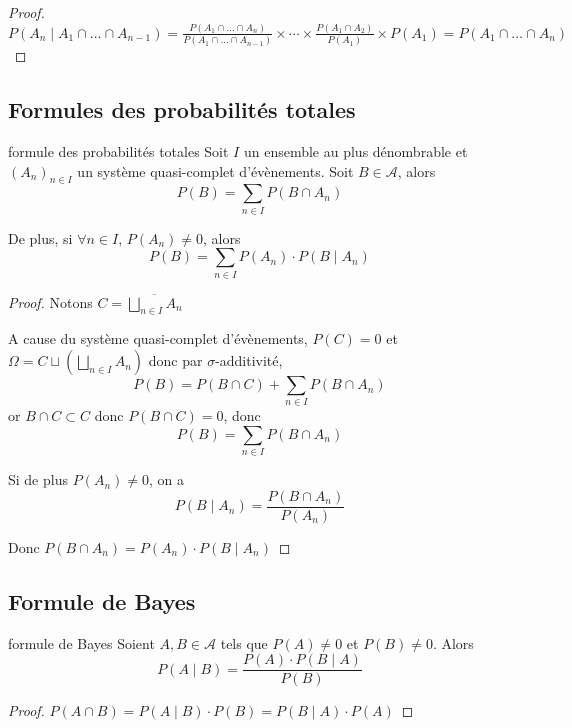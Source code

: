 \begin{proof}
    $P(A_n \mid A_1 \cap \dots \cap A_{n - 1}) = \frac{P(A_1 \cap \dots \cap A_n)}{P(A_1 \cap \dots \cap A_{n - 1})} \times \cdots \times \frac{P(A_1 \cap A_2)}{P(A_1)} \times P(A_1) = P(A_1 \cap \dots \cap A_n)$
\end{proof}

\subsection{Formules des probabilités totales }

\begin{theoreme}{formule des probabilités totales}{}
    Soit $I$ un ensemble au plus dénombrable et $(A_n)_{n \in I}$ un système quasi-complet d'évènements.
    Soit $B \in \mathcal A$, alors 
    $$P(B) = \sum_{n \in I} P(B \cap A_n)$$

    De plus, si $\forall n \in I, \, P(A_n) \neq 0$, alors
    $$P(B) = \sum_{n \in I} P(A_n) \cdot P(B \mid A_n)$$
\end{theoreme}

\begin{proof}
    Notons $\displaystyle C = \overline{ \bigsqcup_{n \in I} A_n }$

    A cause du système quasi-complet d'évènements, $P(C) = 0$ et 
    $\displaystyle \Omega = C \sqcup \left( \bigsqcup_{n \in I} A_n \right)$
    donc par $\sigma$-additivité,
    $$ P(B) = P(B \cap C) + \sum_{n \in I} P(B \cap A_n) $$
    or $B \cap C \subset C$ donc $P(B \cap C) = 0$, 
    donc $$ P(B) = \sum_{n \in I} P(B \cap A_n) $$

    Si de plus $P(A_n) \neq 0$, on a 
    $$ P(B \mid A_n) = \frac{P(B \cap A_n)}{P(A_n)} $$

    Donc $ P(B \cap A_n) = P(A_n) \cdot P(B \mid A_n) $
\end{proof}

\subsection{Formule de Bayes}

\begin{theoreme}{formule de Bayes}{}
    Soient $A, B \in \mathcal A$ tels que $P(A) \neq 0$ et $P(B) \neq 0$.
    Alors 
    $$ P(A \mid B) = \frac{P(A) \cdot P(B \mid A)}{P(B)} $$
\end{theoreme}

\begin{proof}
    $P(A \cap B) = P(A \mid B) \cdot P(B) = P(B \mid A) \cdot P(A)$
\end{proof}

